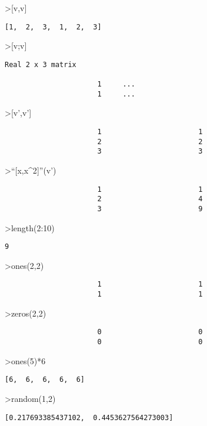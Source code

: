 \documentclass[
]{book}
\begin{document}
\textgreater{[}v,v{]}

\begin{verbatim}
[1,  2,  3,  1,  2,  3]
\end{verbatim}

\textgreater{[}v;v{]}

\begin{verbatim}
Real 2 x 3 matrix

                      1     ...
                      1     ...
\end{verbatim}

\textgreater{[}v',v'{]}

\begin{verbatim}
                      1                       1 
                      2                       2 
                      3                       3 
\end{verbatim}

\textgreater{}``{[}x,x\^{}2{]}''(v')

\begin{verbatim}
                      1                       1 
                      2                       4 
                      3                       9 
\end{verbatim}

\textgreater length(2:10)

\begin{verbatim}
9
\end{verbatim}

\textgreater ones(2,2)

\begin{verbatim}
                      1                       1 
                      1                       1 
\end{verbatim}

\textgreater zeros(2,2)

\begin{verbatim}
                      0                       0 
                      0                       0 
\end{verbatim}

\textgreater ones(5)*6

\begin{verbatim}
[6,  6,  6,  6,  6]
\end{verbatim}

\textgreater random(1,2)

\begin{verbatim}
[0.217693385437102,  0.4453627564273003]
\end{verbatim}
\end{document}
